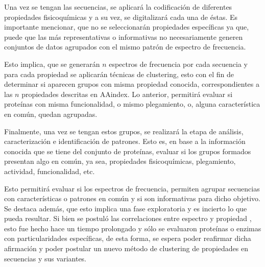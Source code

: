 Una vez se tengan las secuencias, se aplicará la codificación de diferentes propiedades fisicoquímicas y a su vez, se digitalizará cada una de éstas. Es importante mencionar, que no se seleccionarán propiedades específicas ya que, puede que las más representativas o informativas no necesariamente generen conjuntos de datos agrupados con el mismo patrón de espectro de frecuencia. 

Esto implica, que se generarán $n$ espectros de frecuencia por cada secuencia y para cada propiedad se aplicarán técnicas de clustering, esto con el fin de determinar si aparecen grupos con misma propiedad conocida, correspondientes a las $n$ propiedades descritas en AAindex. Lo anterior, permitirá evaluar si proteínas con misma funcionalidad, o mismo plegamiento, o, alguna característica en común, quedan agrupadas.

Finalmente, una vez se tengan estos grupos, se realizará la etapa de análisis, caracterización e identificación de patrones. Esto es, en base a la información conocida que se tiene del conjunto de proteínas, evaluar si los grupos formados presentan algo en común, ya sea, propiedades fisicoquímicas, plegamiento, actividad, funcionalidad, etc. 

Esto permitirá evaluar si los espectros de frecuencia, permiten agrupar secuencias con características o patrones en común y si son informativas para dicho objetivo. Se destaca además, que esto implica una fase exploratoria y es incierto lo que pueda resultar. Si bien se postuló las correlaciones entre espectro y propiedad \cite{veljkovic1985possible}, esto fue hecho hace un tiempo prolongado y sólo se evaluaron proteínas o enzimas con particularidades específicas, de esta forma, se espera poder reafirmar dicha afirmación y poder postular un nuevo método de clustering de propiedades en secuencias y sus variantes.

 